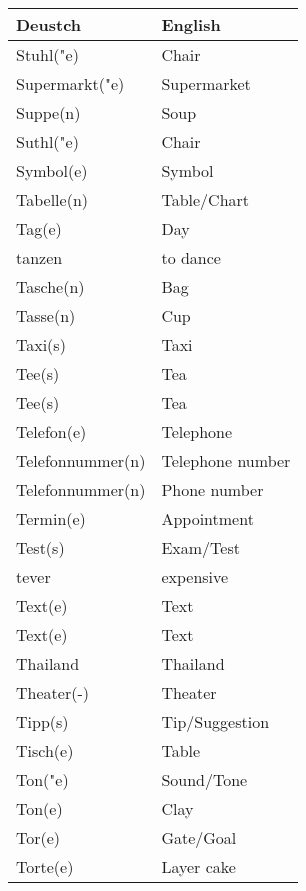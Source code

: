 \documentclass{article}
\renewcommand{\arraystretch}{1}
\begin{document}
\hfill
\begin{minipage}{0.48\textwidth}
    \centering
    \renewcommand{\arraystretch}{1.5}
    \begin{tabular}{|>{\raggedright\arraybackslash}p{3.5cm}|>{\raggedright\arraybackslash}p{3.5cm}|}
        \hline
        \rowcolor{gray!20} \textbf{Deustch} & \textbf{English} \\
        \hline
        Stuhl("e) & Chair \\\hline
        Supermarkt("e) & Supermarket \\\hline
        Suppe(n) & Soup \\\hline
        Suthl("e) & Chair \\\hline
        Symbol(e) & Symbol \\\hline
        Tabelle(n) & Table/Chart \\\hline
        Tag(e) & Day \\\hline
        tanzen & to dance \\\hline
        Tasche(n) & Bag \\\hline
        Tasse(n) & Cup \\\hline
        Taxi(s) & Taxi \\\hline
        Tee(s) & Tea \\\hline
        Tee(s) & Tea \\\hline
        Telefon(e) & Telephone \\\hline
        Telefonnummer(n) & Telephone number \\\hline
        Telefonnummer(n) & Phone number \\\hline
        Termin(e) & Appointment \\\hline
        Test(s) & Exam/Test \\\hline
        tever & expensive \\\hline
        Text(e) & Text \\\hline
        Text(e) & Text \\\hline
        Thailand & Thailand \\\hline
        Theater(-) & Theater \\\hline
        Tipp(s) & Tip/Suggestion \\\hline
        Tisch(e) & Table \\\hline
        Ton("e) & Sound/Tone \\\hline
        Ton(e) & Clay \\\hline
        Tor(e) & Gate/Goal \\\hline
        Torte(e) & Layer cake \\\hline

\end{tabular}
\end{minipage}
\end{document}
